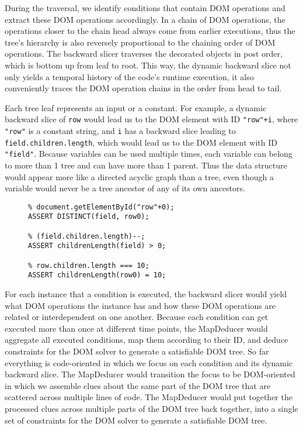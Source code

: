 During the traversal, we identify conditions that contain DOM operations and extract these DOM operations accordingly.  
In a chain of DOM operations, the operations closer to the chain head always come from earlier executions, thus the tree's hierarchy is also reversely proportional to the chaining order of DOM operations.  
The backward slicer traverses the decorated objects in post order, which is bottom up from leaf to root.  
This way, the dynamic backward slice not only yields a temporal history of the code's runtime execution, it also conveniently traces the DOM operation chains in the order from head to tail.

Each tree leaf represents an input or a constant.  
For example, a dynamic backward slice of {\tt row} would lead us to the DOM element with ID {\tt "row"+i}, where {\tt "row"} is a constant string, 
and {\tt i} has a backward slice leading to {\tt field.children.length}, which would lead us to the DOM element with ID {\tt "field"}.  
Because variables can be used multiple times, each variable can belong to more than 1 tree and can have more than 1 parent.  
Thus the data structure would appear more like a directed acyclic graph than a tree, even though a variable would never be a tree ancestor of any of its own ancestors.  

\begin{figure}
\begin{lstlisting}[caption=Constraints for generating a DOM tree that would satisfy for going the {\tt True} branch in the {\tt if} statement of Sample Code ~\ref{dom0}.  The constraints are shown in the input format for the CVC~\cite{cvc3} implementation of the SMT solver. {\tt \%} is the comment operator in CVC.,label=constraints0]
% document.getElementById("field");
% document.getElementById("row"+0);
ASSERT DISTINCT(field, row0);

% (field.children.length)--;
ASSERT childrenLength(field) > 0;

% row.children.length === 10;
ASSERT childrenLength(row0) = 10;
\end{lstlisting}
\end{figure}

For each instance that a condition is executed, the backward slicer would yield what DOM operations the instance has and how these DOM operations are related or interdependent on one another.  
Because each condition can get executed more than once at different time points, the MapDeducer would aggregate all executed conditions, map them according to their ID, and deduce constraints for the DOM solver to generate a satisfiable DOM tree.  
So far everything is code-oriented in which we focus on each condition and its dynamic backward slice.  The MapDeducer would transition the focus to be DOM-oriented in which we assemble clues about the same part of the DOM tree that are scattered across multiple lines of code.  
The MapDeducer would put together the processed clues across multiple parts of the DOM tree back together, into a single set of constraints for the DOM solver to generate a satisfiable DOM tree.

